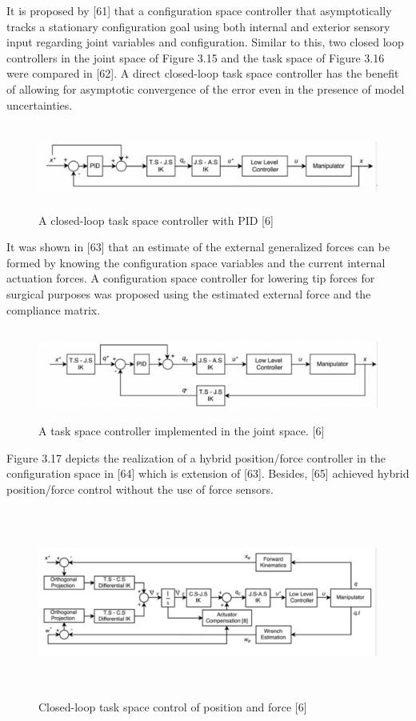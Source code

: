 \documentclass[12pt,twoside,a4]{mwbk}
\begin{document}
\noindent It is proposed by [61] that a configuration space controller that asymptotically tracks a stationary configuration goal using both internal and exterior sensory input regarding joint variables and configuration.
\newpage
\noindent Similar to this, two closed loop controllers in the joint space of Figure 3.15 and the task space of Figure 3.16 were compared in [62]. A direct closed-loop task space controller has the benefit of allowing for asymptotic convergence of the error even in the presence of model uncertainties.
\begin{figure}[h]
    \centering
    \includegraphics[width=15.3cm, height=2.8cm]{cont2.png}
    \caption{A closed-loop task space controller with PID [6]}
\end{figure}

\noindent It was shown in [63] that an estimate of the external generalized forces can be formed by knowing the configuration space variables and the current internal actuation forces. A configuration space controller for lowering tip forces for surgical purposes was proposed using the estimated external force and the compliance matrix. 
\begin{figure}[h]
    \centering
    \includegraphics[width=15.3cm, height=3.0cm]{cont3.png}
    \caption{A task space controller implemented in the joint space. [6]}
\end{figure}

\noindent Figure 3.17 depicts the realization of a hybrid position/force controller in the configuration space in [64] which is extension of [63]. Besides, [65] achieved hybrid position/force control without the use of force sensors.
\newpage
\begin{figure}[h]
    \centering
    \includegraphics[width=15.0cm, height=6.2cm]{cont4.png}
    \caption{Closed-loop task space control of position and force [6]}
\end{figure}
\end{document}
